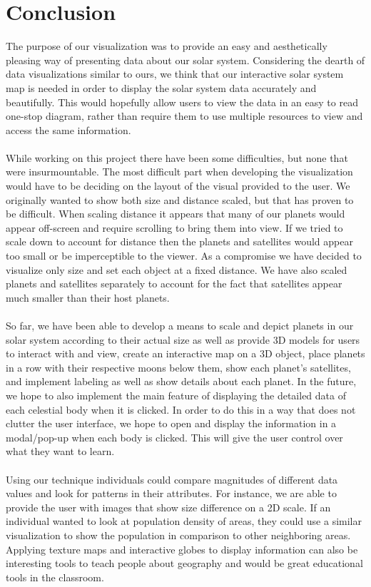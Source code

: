 \documentclass[journal]{vgtc}                %
\begin{document}
\section{Conclusion}
The purpose of our visualization was to provide an easy and aesthetically pleasing way of presenting data about our solar system.  Considering the dearth of data visualizations similar to ours, we think that our interactive solar system map is needed in order to display the solar system data accurately and beautifully. This would hopefully allow users to view the data in an easy to read one-stop diagram, rather than require them to use multiple resources to view and access the same information. 
\\\\
While working on this project there have been some difficulties, but none that were insurmountable. The most difficult part when developing the visualization would have to be deciding on the layout of the visual provided to the user. We originally wanted to show both size and distance scaled, but that has proven to be difficult. When scaling distance it appears that many of our planets would appear off-screen and require scrolling to bring them into view. If we tried to scale down to account for distance then the planets and satellites would appear too small or be imperceptible to the viewer. As a compromise we have decided to visualize only size and set each object at a fixed distance. We have also scaled planets and satellites separately to account for the fact that satellites appear much smaller than their host planets.
\\\\
So far, we have been able to develop a means to scale and depict planets in our solar system according to their actual size as well as provide 3D models for users to interact with and view, create an interactive map on a 3D object, place planets in a row with their respective moons below them, show each planet’s satellites, and implement labeling as well as show details about each planet. In the future, we hope to also implement the main feature of displaying the detailed data of each celestial body when it is clicked. In order to do this in a way that does not clutter the user interface, we hope to open and display the information in a modal/pop-up when each body is clicked. This will give the user control over what they want to learn. 
\\\\
Using our technique individuals could compare magnitudes of different data values and look for patterns in their attributes. For instance, we are able to provide the user with images that show size difference on a 2D scale. If an individual wanted to look at population density of areas, they could use a similar visualization to show the population in comparison to other neighboring areas. Applying texture maps and interactive globes to display information can also be interesting tools to teach people about geography and would be great educational tools in the classroom.
\end{document}
